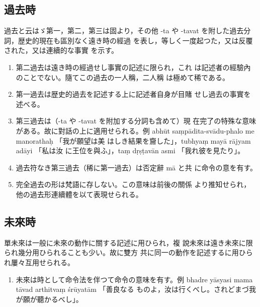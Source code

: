 \subsection{過去時}
\numberParagraph
過去と云はゞ第一，第二，第三は固より，その他 -ta や
-tavat を附した過去分詞，歴史的現在も區別なく遠き時の經過
を表し，等しく一度起つた，又は反覆された，又は連續的な事實
を示す。
\begin{enumerate}[label=(\alph*)]
\item 第二過去は遠き時の經過せし事實の記述に限られ，これ
は記述者の經驗內のことでない。隨てこの過去の一人稱，二人稱
は極めて稀である。
\item 第一過去は歴史的過去を記述する上に記述者自身が目賭
せし過去の事實を述べる。
\item 第三過去は（-ta や -tavat を附加する分詞も含めて）現
在完了の特殊な意味がある。故に對話の上に適用せられる。例
abhūt saṃpādita-svādu-phalo me manorathaḥ 「我が願望は美
はしき結果を齎した」，tubhyaṃ mayā rājyam adāyi 「私は汝
に王位を與ふ」，taṃ dṛṣṭavān asmi 「我れ彼を見たり」。
\item 過去符なき第三過去（稀に第一過去）は否定辭 mā と共
に命令の意を有す。
\item 完全過去の形は梵語に存しない。この意味は前後の關係
より推知せられ，他の過去形連續體を以て表現せられる。
\end{enumerate}

\subsection{未來時}
\numberParagraph
單未來は一般に未來の動作に關する記述に用ひられ，複
說未來は遠き未來に限られ幾分用ひられることも少い。故に雙方
共に同一の動作を記述するに用ひられ屢々互用せられる。
\begin{enumerate}[label=(\alph*)]
\item 未來は時として命令法を伴つて命令の意味を有す。例
bhadre yāsyasi mama tāvad arthitvaṃ śrūyatām 「善良なる
ものよ，汝は行くべし。されどまづ我が願が聽かるべし」。
\end{enumerate}

